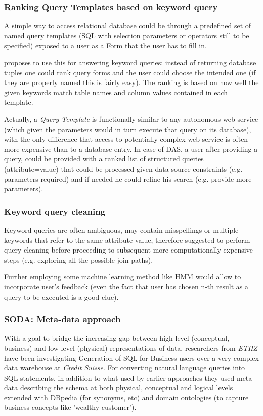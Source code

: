 \subsubsection*{Ranking Query Templates based on keyword query}
A simple way to access relational database could  be through a predefined set of named query templates (SQL with selection parameters or operators still to be specified) exposed to a user as a Form that the user has to fill in.

\cite{forms_kws} proposes to use this for answering keyword queries: instead of returning database tuples one could rank query forms and the user could choose the intended one (if they are properly named this is fairly easy). The ranking is based on how well the given keywords match table names and column values contained in each template.

Actually, a \textit{Query Template} is functionally similar to any autonomous web service (which given the parameters would in turn execute that query on its database), with the only difference that access to potentially complex web service is often more expensive than to a database entry.  In case of DAS, a user after providing a query, could be provided with a ranked list of structured queries (attribute=value) that could be processed given data source constraints (e.g. parameters required) and if needed he could refine his search (e.g. provide more parameters).

\subsubsection*{Keyword query cleaning}
Keyword queries are often ambiguous, may contain misspellings or multiple keywords that refer to the same attribute value,  therefore \cite{kw_cleaning} suggested to perform query cleaning before proceeding to subsequent more computationally expensive steps (e.g. exploring all the possible join paths).

Further employing some machine learning method like HMM\cite{kw_cleaning_hmm} would allow to incorporate user's feedback (even the fact that user has chosen n-th result as a query to be executed is a good clue).

\subsubsection*{SODA: Meta-data approach}

With a goal to bridge the increasing gap between high-level (conceptual, business) and low level (physical) representations of data, researchers from \textit{ETHZ} have been investigating Generation of SQL for Business users over a very complex data warehouse at \textit{Credit Suisse}.  For converting natural language queries 
 into SQL statements, in addition to what used by earlier approaches they used meta-data describing the schema at both physical, conceptual and logical levels extended with DBpedia (for synonyms, etc) and domain ontologies (to capture business concepts like 'wealthy customer').

